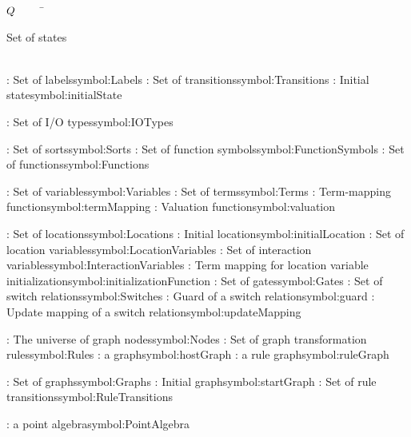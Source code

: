 \begin{tabbing}
$Q$~~~~~\=\parbox{5in}{Set of states\dotfill \pageref{symbol:States}}\\
\addsymbol \Labels: {Set of labels}{symbol:Labels}
\addsymbol \Transitions: {Set of transitions}{symbol:Transitions}
\addsymbol \initialState: {Initial state}{symbol:initialState}

\addsymbol \IOTypes: {Set of I/O types}{symbol:IOTypes}

\addsymbol \Sorts: {Set of sorts}{symbol:Sorts}
\addsymbol \FunctionSymbols: {Set of function symbols}{symbol:FunctionSymbols}
\addsymbol \Functions: {Set of functions}{symbol:Functions}

\addsymbol \Variables: {Set of variables}{symbol:Variables}
\addsymbol \Terms: {Set of terms}{symbol:Terms}
\addsymbol \termMapping: {Term-mapping function}{symbol:termMapping}
\addsymbol \valuation: {Valuation function}{symbol:valuation}

\addsymbol \Locations: {Set of locations}{symbol:Locations}
\addsymbol \initialLocation: {Initial location}{symbol:initialLocation}
\addsymbol \LocationVariables: {Set of location variables}{symbol:LocationVariables}
\addsymbol \InteractionVariables: {Set of interaction variables}{symbol:InteractionVariables}
\addsymbol \initializationFunction: {Term mapping for location variable initialization}{symbol:initializationFunction}
\addsymbol \Gates: {Set of gates}{symbol:Gates}
\addsymbol \Switches: {Set of switch relations}{symbol:Switches}
\addsymbol \guard: {Guard of a switch relation}{symbol:guard}
\addsymbol \updateMapping: {Update mapping of a switch relation}{symbol:updateMapping}

\addsymbol \Nodes: {The universe of graph nodes}{symbol:Nodes}
\addsymbol \Rules: {Set of graph transformation rules}{symbol:Rules}
\addsymbol \hostGraph: {a graph}{symbol:hostGraph}
\addsymbol {}: {a rule graph}{symbol:ruleGraph}

\addsymbol \Graphs: {Set of graphs}{symbol:Graphs}
\addsymbol \startGraph: {Initial graph}{symbol:startGraph}
\addsymbol \RuleTransitions: {Set of rule transitions}{symbol:RuleTransitions}

\addsymbol \PointAlgebra: {a point algebra}{symbol:PointAlgebra}

\end{tabbing}
